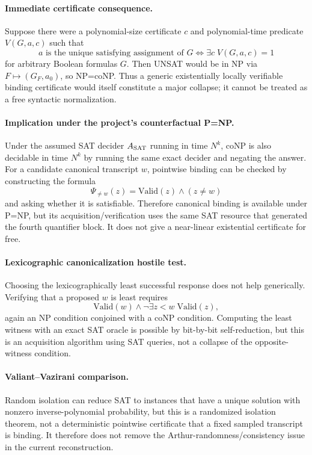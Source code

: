 \documentclass[11pt]{article}
\begin{document}
\paragraph{Immediate certificate consequence.}
Suppose there were a polynomial-size certificate $c$ and polynomial-time predicate $V(G,a,c)$ such that
\[
a\text{ is the unique satisfying assignment of }G
\iff \exists c\;V(G,a,c)=1
\]
for arbitrary Boolean formulas $G$. Then UNSAT would be in NP via $F\mapsto(G_F,a_0)$, so NP=coNP. Thus a generic existentially locally verifiable binding certificate would itself constitute a major collapse; it cannot be treated as a free syntactic normalization.

\paragraph{Implication under the project's counterfactual P=NP.}
Under the assumed SAT decider $A_{\rm SAT}$ running in time $N^k$, coNP is also decidable in time $N^k$ by running the same exact decider and negating the answer. For a candidate canonical transcript $w$, pointwise binding can be checked by constructing the formula
\[
\Psi_{\neq w}(z)=
\mathrm{Valid}(z)\wedge(z\neq w)
\]
and asking whether it is satisfiable. Therefore canonical binding is available under P=NP, but its acquisition/verification uses the same SAT resource that generated the fourth quantifier block. It does not give a near-linear existential certificate for free.

\paragraph{Lexicographic canonicalization hostile test.}
Choosing the lexicographically least successful response does not help generically. Verifying that a proposed $w$ is least requires
\[
\mathrm{Valid}(w)\wedge
\neg\exists z<w\;\mathrm{Valid}(z),
\]
again an NP condition conjoined with a coNP condition. Computing the least witness with an exact SAT oracle is possible by bit-by-bit self-reduction, but this is an acquisition algorithm using SAT queries, not a collapse of the opposite-witness condition.

\paragraph{Valiant--Vazirani comparison.}
Random isolation can reduce SAT to instances that have a unique solution with nonzero inverse-polynomial probability, but this is a randomized isolation theorem, not a deterministic pointwise certificate that a fixed sampled transcript is binding. It therefore does not remove the Arthur-randomness/consistency issue in the current reconstruction.
\end{document}
